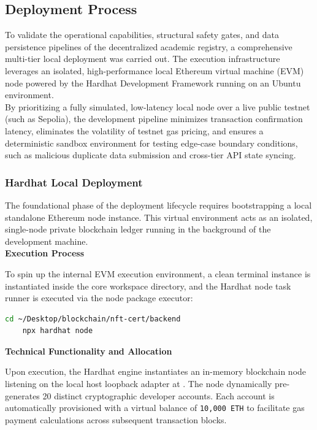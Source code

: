 \subsection{Deployment Process}

To validate the operational capabilities, structural safety gates, and data persistence pipelines of the decentralized academic registry, a comprehensive multi-tier local deployment was carried out. The execution infrastructure leverages an isolated, high-performance local Ethereum virtual machine (EVM) node powered by the Hardhat Development Framework running on an Ubuntu environment.\\

By prioritizing a fully simulated, low-latency local node over a live public testnet (such as Sepolia), the development pipeline minimizes transaction confirmation latency, eliminates the volatility of testnet gas pricing, and ensures a deterministic sandbox environment for testing edge-case boundary conditions, such as malicious duplicate data submission and cross-tier API state syncing.

\subsubsection{Hardhat Local Deployment}

The foundational phase of the deployment lifecycle requires bootstrapping a local standalone Ethereum node instance. This virtual environment acts as an isolated, single-node private blockchain ledger running in the background of the development machine.\\

\textbf{Execution Process}

To spin up the internal EVM execution environment, a clean terminal instance is instantiated inside the core workspace directory, and the Hardhat node task runner is executed via the node package executor:

\begin{lstlisting}[language=bash, style=codeStyle]
    cd ~/Desktop/blockchain/nft-cert/backend
    npx hardhat node
\end{lstlisting}

\textbf{Technical Functionality and Allocation}

Upon execution, the Hardhat engine instantiates an in-memory blockchain node listening on the local host loopback adapter at . The node dynamically pre-generates 20 distinct cryptographic developer accounts. Each account is automatically provisioned with a virtual balance of \texttt{10,000 ETH} to facilitate gas payment calculations across subsequent transaction blocks.\\

